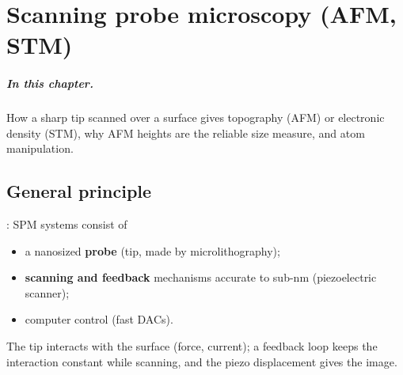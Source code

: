 \chapter{Scanning probe microscopy (AFM, STM)}
\label{ch:spm}

\paragraph{In this chapter.} How a sharp tip scanned over a surface gives topography (AFM) or electronic density (STM),
why AFM heights are the reliable size measure, and atom manipulation.

\section{General principle}
: SPM systems consist of
\begin{itemize}
  \item a nanosized \textbf{probe} (tip, made by microlithography);
  \item \textbf{scanning and feedback} mechanisms accurate to sub-nm (piezoelectric scanner);
  \item computer control (fast DACs).
\end{itemize}
The tip interacts with the surface (force, current); a feedback loop keeps the interaction constant while scanning,
and the piezo displacement gives the image.

